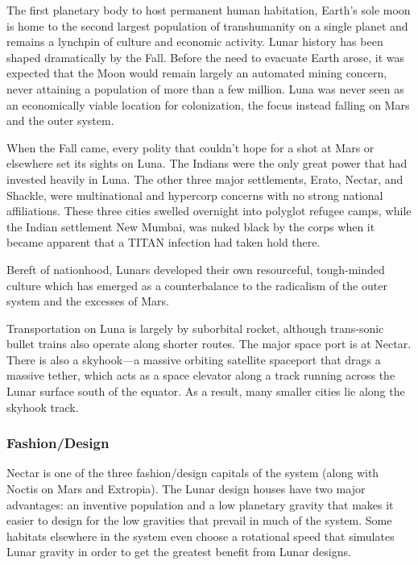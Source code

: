 The first planetary body to host permanent human 
habitation, Earth's sole moon is home to the second 
largest population of transhumanity on a single 
planet and remains a lynchpin of culture and economic
activity. Lunar history has been shaped dramatically
by the Fall. Before the need to evacuate Earth
arose, it was expected that the Moon would remain 
largely an automated mining concern, never attaining
a population of more than a few million. Luna
was never seen as an economically viable location for 
colonization, the focus instead falling on Mars and 
the outer system.

When the Fall came, every polity that couldn't 
hope for a shot at Mars or elsewhere set its sights 
on Luna. The Indians were the only great power that 
had invested heavily in Luna. The other three major 
settlements, Erato, Nectar, and Shackle, were multinational
and hypercorp concerns with no strong national
affiliations. These three cities swelled overnight
into polyglot refugee camps, while the Indian settlement
New Mumbai, was nuked black by the corps
when it became apparent that a TITAN infection had 
taken hold there.

Bereft of nationhood, Lunars developed their own 
resourceful, tough-minded culture which has emerged 
as a counterbalance to the radicalism of the outer 
system and the excesses of Mars.

Transportation on Luna is largely by suborbital 
rocket, although trans-sonic bullet trains also operate
along shorter routes. The major space port is at
Nectar. There is also a skyhook—a massive orbiting 
satellite spaceport that drags a massive tether, which 
acts as a space elevator along a track running across 
the Lunar surface south of the equator. As a result, 
many smaller cities lie along the skyhook track.

\subsubsection{Fashion/Design}

Nectar is one of the three fashion/design capitals of 
the system (along with Noctis on Mars and Extropia). 
The Lunar design houses have two major advantages: 
an inventive population and a low planetary gravity 
that makes it easier to design for the low gravities that 
prevail in much of the system. Some habitats elsewhere 
in the system even choose a rotational speed that 
simulates Lunar gravity in order to get the greatest 
benefit from Lunar designs.

